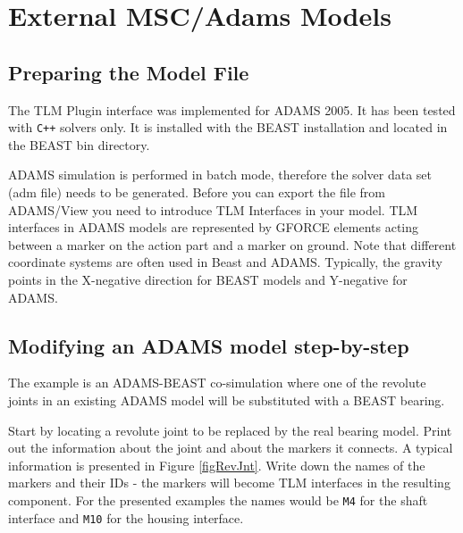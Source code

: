 \chapter{External MSC/Adams Models}
\label{MMADAMS}

\section{Preparing the Model File}
\label{secPrepareADAMS}
The TLM Plugin interface was implemented for ADAMS 2005. It has been
tested with \verb!C++! solvers only. It is installed with the BEAST
installation and located in the BEAST bin directory.

ADAMS simulation is performed in batch mode, therefore the solver
data set (adm file) needs to be generated.
Before you can export the file from ADAMS/View you need to
introduce TLM Interfaces in your model. TLM interfaces in ADAMS
models are represented by GFORCE elements acting between a
marker on the action part and a marker on ground. Note that
different coordinate systems are often used in Beast and ADAMS.
Typically, the gravity points in the X-negative direction
for BEAST models and Y-negative for ADAMS.

\section{Modifying an ADAMS model step-by-step}
\label{secADAMSsteps}
The example is an ADAMS-BEAST co-simulation where one of the revolute
joints in an existing ADAMS model will be substituted with a BEAST
bearing.

Start by locating a revolute joint to be replaced by
the real bearing model. Print out the information
about the joint and about the markers it connects.
A typical information is presented in Figure \ref{figRevJnt}.
Write down the names of the markers and their IDs -
the markers will become TLM interfaces in the
resulting component. For the presented examples
the names would be {\tt M4} for the shaft interface
and {\tt M10} for the housing interface.


